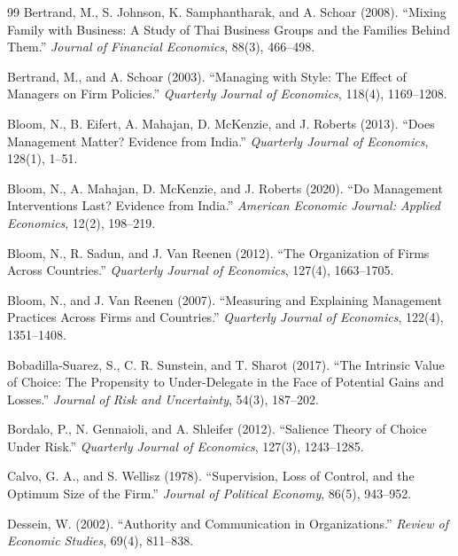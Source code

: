 \documentclass[11pt,a4paper]{article}
\theoremstyle{plain}
\begin{document}
\begin{thebibliography}{99}
Bertrand, M., S. Johnson, K. Samphantharak, and A. Schoar (2008). ``Mixing Family with Business: A Study of Thai Business Groups and the Families Behind Them.'' \emph{Journal of Financial Economics}, 88(3), 466--498.

Bertrand, M., and A. Schoar (2003). ``Managing with Style: The Effect of Managers on Firm Policies.'' \emph{Quarterly Journal of Economics}, 118(4), 1169--1208.

Bloom, N., B. Eifert, A. Mahajan, D. McKenzie, and J. Roberts (2013). ``Does Management Matter? Evidence from India.'' \emph{Quarterly Journal of Economics}, 128(1), 1--51.

Bloom, N., A. Mahajan, D. McKenzie, and J. Roberts (2020). ``Do Management Interventions Last? Evidence from India.'' \emph{American Economic Journal: Applied Economics}, 12(2), 198--219.

Bloom, N., R. Sadun, and J. Van Reenen (2012). ``The Organization of Firms Across Countries.'' \emph{Quarterly Journal of Economics}, 127(4), 1663--1705.

Bloom, N., and J. Van Reenen (2007). ``Measuring and Explaining Management Practices Across Firms and Countries.'' \emph{Quarterly Journal of Economics}, 122(4), 1351--1408.

Bobadilla-Suarez, S., C. R. Sunstein, and T. Sharot (2017). ``The Intrinsic Value of Choice: The Propensity to Under-Delegate in the Face of Potential Gains and Losses.'' \emph{Journal of Risk and Uncertainty}, 54(3), 187--202.

Bordalo, P., N. Gennaioli, and A. Shleifer (2012). ``Salience Theory of Choice Under Risk.'' \emph{Quarterly Journal of Economics}, 127(3), 1243--1285.

Calvo, G. A., and S. Wellisz (1978). ``Supervision, Loss of Control, and the Optimum Size of the Firm.'' \emph{Journal of Political Economy}, 86(5), 943--952.

Dessein, W. (2002). ``Authority and Communication in Organizations.'' \emph{Review of Economic Studies}, 69(4), 811--838.


\end{thebibliography}
\end{document}
